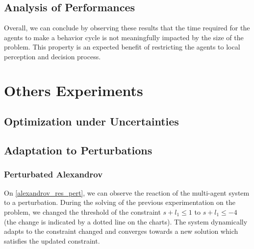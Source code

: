 \section{Analysis of Performances}

Overall, we can conclude by observing these results that the time required for the agents to make a behavior cycle is not meaningfully impacted by the size of the problem. This property is an expected benefit of restricting the agents to local perception and decision process.

\chapter{Others Experiments}

\section{Optimization under Uncertainties}

\section{Adaptation to Perturbations}

\subsection{Perturbated Alexandrov}
 
On \figurename \ref{alexandrov_res_pert}, we can observe the reaction of the multi-agent system to a perturbation. During the solving of the previous experimentation on the problem, we changed the threshold of the constraint $s + l_1 \leq 1$ to $s + l_1 \leq -4$ (the change is indicated by a dotted line on the charts). The system dynamically adapts to the constraint changed and converges towards a new solution which satisfies the updated constraint.

